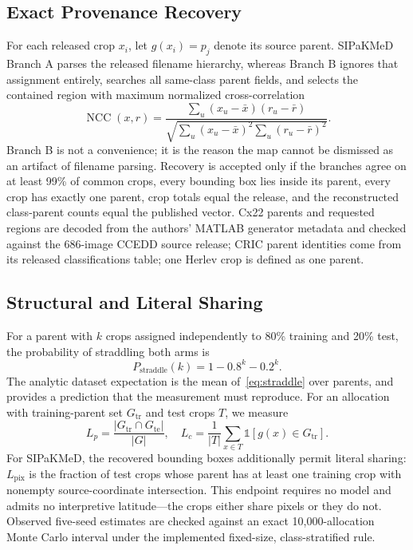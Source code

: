\documentclass[conference]{IEEEtran}
\begin{document}
\subsection{Exact Provenance Recovery}
For each released crop $x_i$, let $g(x_i)=p_j$ denote its source parent.
SIPaKMeD Branch A parses the released filename hierarchy, whereas Branch B ignores that assignment entirely, searches all same-class parent fields, and selects the contained region with maximum normalized cross-correlation
\begin{equation}
\operatorname{NCC}(x,r)=
\frac{\sum_u(x_u-\bar{x})(r_u-\bar{r})}
{\sqrt{\sum_u(x_u-\bar{x})^2\sum_u(r_u-\bar{r})^2}}.
\label{eq:ncc}
\end{equation}
Branch B is not a convenience; it is the reason the map cannot be dismissed as an artifact of filename parsing.
Recovery is accepted only if the branches agree on at least 99\% of common crops, every bounding box lies inside its parent, every crop has exactly one parent, crop totals equal the release, and the reconstructed class-parent counts equal the published vector.
Cx22 parents and requested regions are decoded from the authors' MATLAB generator metadata and checked against the 686-image CCEDD source release; CRIC parent identities come from its released classifications table; one Herlev crop is defined as one parent.

\subsection{Structural and Literal Sharing}
For a parent with $k$ crops assigned independently to 80\% training and 20\% test, the probability of straddling both arms is
\begin{equation}
P_{\mathrm{straddle}}(k)=1-0.8^k-0.2^k.
\label{eq:straddle}
\end{equation}
The analytic dataset expectation is the mean of~\eqref{eq:straddle} over parents, and provides a prediction that the measurement must reproduce.
For an allocation with training-parent set $G_{\mathrm{tr}}$ and test crops $T$, we measure
\begin{equation}
L_{p}=\frac{|G_{\mathrm{tr}}\cap G_{\mathrm{te}}|}{|G|},\quad
L_{c}=\frac{1}{|T|}\sum_{x\in T}\mathbb{1}[g(x)\in G_{\mathrm{tr}}].
\label{eq:leakage}
\end{equation}
For SIPaKMeD, the recovered bounding boxes additionally permit literal sharing: $L_{\mathrm{pix}}$ is the fraction of test crops whose parent has at least one training crop with nonempty source-coordinate intersection.
This endpoint requires no model and admits no interpretive latitude---the crops either share pixels or they do not.
Observed five-seed estimates are checked against an exact 10,000-allocation Monte Carlo interval under the implemented fixed-size, class-stratified rule.
\end{document}

